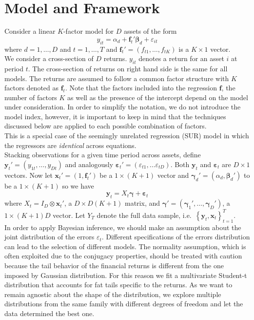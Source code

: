\documentclass[12pt]{article}
\begin{document}
\section{Model and Framework}
Consider a linear $K$-factor model for $D$ assets of the form
\begin{equation*}
y_{it}=\alpha _{d} + \mathbf{f}_{t}' \boldsymbol{\beta}_d + \varepsilon_{it}
\end{equation*}
where $d = 1, \hdots, D$ and $t = 1, \hdots, T$ and $\mathbf{f}_{t}'=\left(f_{t1}, \hdots,f_{tK}\right)$ is a $K\times1$ vector.\\
We consider a cross-section of $D$ returns. $y_{it}$ denotes a return for an asset $i$ at period $t$. The cross-section of returns on right hand side is the same for all models. The returns are assumed to follow a common factor structure with $K$ factors denoted as $\mathbf{f}_{t}$. Note that the factors included into the regression $\mathbf{f}$, the number of factors $K$ as well as the presence of the intercept depend on the model under consideration.  In order to simplify the notation, we do not introduce the model index, however, it is important to keep in mind that the techniques discussed below are applied to each possible combination of factors.\\
This is a special case of the seemingly unrelated regression (SUR) model in which the regressors are \emph{identical} across equations. \\
Stacking observations for a given time period across assets, define $\mathbf{y}_t' = (y_{1t}, \hdots, y_{Dt})$ and analogously $\boldsymbol{\varepsilon}_t' = \left( \varepsilon_{t1}, \hdots \varepsilon_{tD} \right)$. Both $\mathbf{y}_t$ and $\boldsymbol{\varepsilon}_t$ are $D \times 1$ vectors.
Now let $\mathbf{x}_t' = (1, \mathbf{f}_t')$ be a $1 \times (K+1)$ vector and $\boldsymbol{\gamma}_d' = (\alpha_d, \boldsymbol{\beta}_d')$ to be a $1 \times (K+1)$ so we have
\begin{equation*}
\mathbf{y}_t = X_t \boldsymbol{\gamma} + \boldsymbol{\varepsilon}_t
\end{equation*}
where $X_t = I_D \otimes \mathbf{x}_t'$, a $D \times D(K+1)$ matrix, and $\boldsymbol{\gamma}'= \left( \boldsymbol{\gamma}_1', \hdots, \boldsymbol{\gamma}_D' \right)$, a $1 \times (K+1)D$ vector. 
Let $Y_T$ denote the full data sample, i.e.\ $\left\{ \mathbf{y}_t, \mathbf{x}_t \right\}_{t=1}^T$.\\
In order to apply Bayesian inference, we should make an assumption about the joint distribution of the errors $\varepsilon_t$.  Different specifications of the errors distribution can lead to the selection of different models. The normality assumption, which is often exploited due to the conjugacy properties, should be treated with caution because the tail behavior of the financial returns is different from the one imposed by Gaussian distribution. For this reason we fit a multivariate Student-t distribution that accounts for fat tails specific to the returns. As we want to remain agnostic about the shape of the distribution, we explore multiple distributions from the same family with different degrees of freedom and let the data determined the best one.\\
\end{document}
